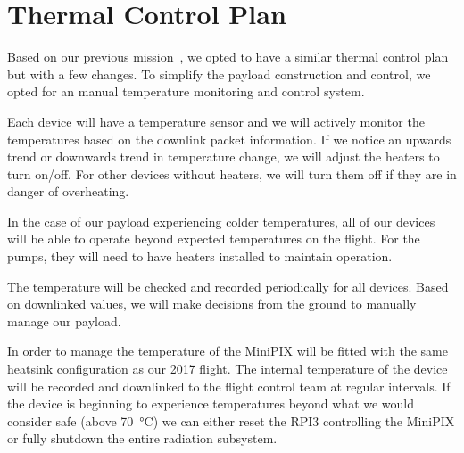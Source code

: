 \section{Thermal Control Plan}
\label{sec:TCP}
Based on our previous mission~\cite{SORA}, we opted to have a similar thermal control plan but with a few changes.  To simplify the payload construction and control, we opted for an manual temperature monitoring and control system.  

Each device will have a temperature sensor and we will actively monitor the temperatures based on the downlink packet information.  If we notice an upwards trend or downwards trend in temperature change, we will adjust the heaters to turn on/off.  For other devices without heaters, we will turn them off if they are in danger of overheating.

In the case of our payload experiencing colder temperatures, all of our devices will be able to operate beyond expected temperatures on the flight.  For the pumps, they will need to have heaters installed to maintain operation.

The temperature will be checked and recorded periodically for all devices.  Based on downlinked values, we will make decisions from the ground to manually manage our payload.

In order to manage the temperature of the  MiniPIX will be fitted with the same heatsink configuration as our 2017 flight. The internal temperature of the device will be recorded and downlinked to the flight control team at regular intervals. If the device is beginning to experience temperatures beyond what we would consider safe (above \SI{70}{\celsius}) we can either reset the RPI3 controlling the MiniPIX or fully shutdown the entire radiation subsystem.

